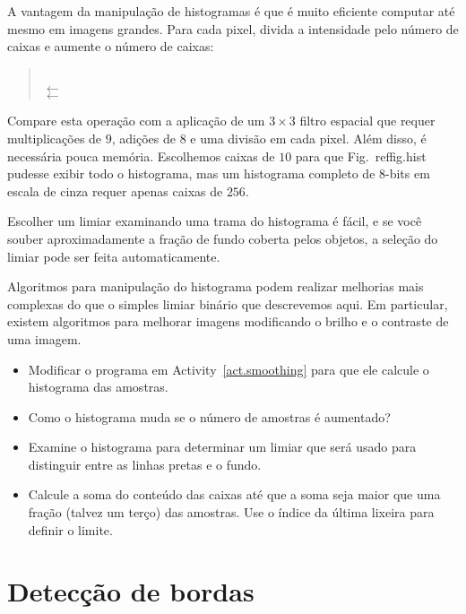 A vantagem da manipulação de histogramas é que é muito eficiente computar até mesmo em imagens grandes. Para cada pixel, divida a intensidade pelo número de caixas e aumente o número de caixas:
\begin{quote}
\\
\hspace*{2em} $\leftarrow$ \\
\hspace*{2em} $\leftarrow$ 
\end{quote}
Compare esta operação com a aplicação de um $3\times 3$ filtro espacial que requer multiplicações de $9$, adições de $8$ e uma divisão em cada pixel. Além disso, é necessária pouca memória. Escolhemos caixas de $10$ para que Fig.~ref{fig.hist} pudesse exibir todo o histograma, mas um histograma completo de $8$-bits em escala de cinza requer apenas caixas de $256$.

Escolher um limiar examinando uma trama do histograma é fácil, e se você souber aproximadamente a fração de fundo coberta pelos objetos, a seleção do limiar pode ser feita automaticamente.

Algoritmos para manipulação do histograma podem realizar melhorias mais complexas do que o simples limiar binário que descrevemos aqui. Em particular, existem algoritmos para melhorar imagens modificando o brilho e o contraste de uma imagem. 

\begin{framed}
\begin{itemize}
\item Modificar o programa em Activity~\ref{act.smoothing} para que ele calcule o histograma das amostras.
\item Como o histograma muda se o número de amostras é aumentado?
\item Examine o histograma para determinar um limiar que será usado para distinguir entre as linhas pretas e o fundo.
\item Calcule a soma do conteúdo das caixas até que a soma seja maior que uma fração (talvez um terço) das amostras. Use o índice da última lixeira para definir o limite.
\end{itemize}
\end{framed}

\section{Detecção de bordas}\label{s.edge-detection}

